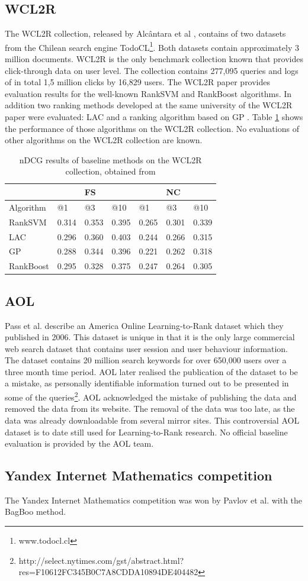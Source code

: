 \subsection{WCL2R}
The WCL2R collection, released by Alc{\^a}ntara et al \cite{Alcantara2010}, contains of two datasets from the Chilean search engine TodoCL\footnote{www.todocl.cl}. Both datasets contain approximately 3 million documents. WCL2R is the only benchmark collection known that provides click-through data on user level. The collection contains 277,095 queries and logs of in total 1,5 million clicks by 16,829 users. The WCL2R paper provides evaluation results for the well-known Rank\ac{SVM} \cite{Herbrich1999,Joachims2002} and RankBoost \cite{Freund2003} algorithms. In addition two ranking methods developed at the same university of the WCL2R paper were evaluated: LAC \cite{Veloso2008} and a ranking algorithm based on \ac{GP} \cite{DeAlmeida2007}. Table \ref{tab:results_WCL2R} shows the performance of those algorithms on the WCL2R collection. No evaluations of other algorithms on the WCL2R collection are known.

\begin{table}[!h]
\begin{tabular}{l|lll|lll}
 &  & FS &  &  & NC &  \\ 
\hline
Algorithm & @1 & @3 & @10 & @1 & @3 & @10 \\ 
\hline
RankSVM & 0.314 & 0.353 & 0.395 & 0.265 & 0.301 & 0.339 \\ 
LAC & 0.296 & 0.360 & 0.403 & 0.244 & 0.266 & 0.315 \\ 
GP & 0.288 & 0.344 & 0.396 & 0.221 & 0.262 & 0.318 \\ 
RankBoost & 0.295 & 0.328 & 0.375 & 0.247 & 0.264 & 0.305 \\ 
\end{tabular}
\caption{\acs{nDCG} results of baseline methods on the WCL2R collection, obtained from \cite{Alcantara2010}}
\label{tab:results_WCL2R}
\end{table}

\subsection{AOL}
Pass et al. \cite{Pass2006} describe an America Online Learning-to-Rank dataset which they published in 2006. This dataset is unique in that it is the only large commercial web search dataset that contains user session and user behaviour information. The dataset contains 20 million search keywords for over 650,000 users over a three month time period. AOL later realised the publication of the dataset to be a mistake, as personally identifiable information turned out to be presented in some of the queries\footnote{http://select.nytimes.com/gst/abstract.html?res=F10612FC345B0C7A8CDDA10894DE404482}. AOL acknowledged the mistake of publishing the data and removed the data from its website. The removal of the data was too late, as the data was already downloadable from several mirror sites. This controversial AOL dataset is to date still used for Learning-to-Rank research. No official baseline evaluation is provided by the AOL team.

\subsection{Yandex Internet Mathematics competition}
The Yandex Internet Mathematics competition was won by Pavlov et al. \cite{Pavlov2010} with the BagBoo method.
